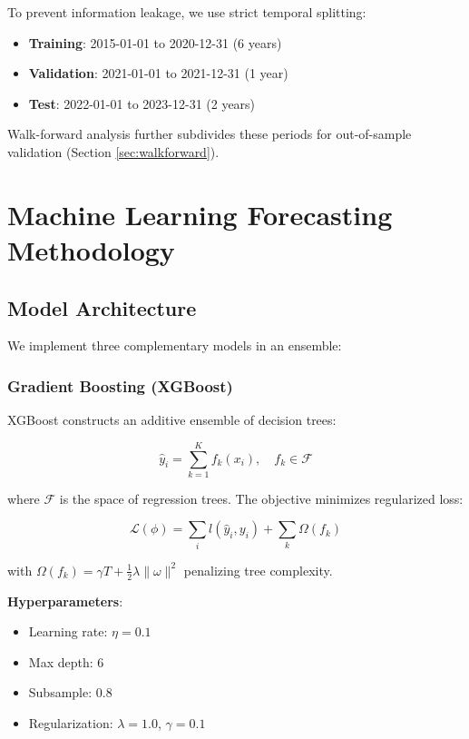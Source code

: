 \documentclass[12pt,a4paper]{article}
\begin{document}
To prevent information leakage, we use strict temporal splitting:

\begin{itemize}
    \item \textbf{Training}: 2015-01-01 to 2020-12-31 (6 years)
    \item \textbf{Validation}: 2021-01-01 to 2021-12-31 (1 year)
    \item \textbf{Test}: 2022-01-01 to 2023-12-31 (2 years)
\end{itemize}

Walk-forward analysis further subdivides these periods for out-of-sample validation (Section \ref{sec:walkforward}).

\section{Machine Learning Forecasting Methodology}

\subsection{Model Architecture}

We implement three complementary models in an ensemble:

\subsubsection{Gradient Boosting (XGBoost)}

XGBoost \citep{chen2016xgboost} constructs an additive ensemble of decision trees:

\begin{equation}
\hat{y}_i = \sum_{k=1}^K f_k(x_i), \quad f_k \in \mathcal{F}
\end{equation}

where $\mathcal{F}$ is the space of regression trees. The objective minimizes regularized loss:

\begin{equation}
\mathcal{L}(\phi) = \sum_i l(\hat{y}_i, y_i) + \sum_k \Omega(f_k)
\end{equation}

with $\Omega(f_k) = \gamma T + \frac{1}{2}\lambda \|\omega\|^2$ penalizing tree complexity.

\textbf{Hyperparameters}:
\begin{itemize}
    \item Learning rate: $\eta = 0.1$
    \item Max depth: 6
    \item Subsample: 0.8
    \item Regularization: $\lambda = 1.0$, $\gamma = 0.1$
\end{itemize}
\end{document}
